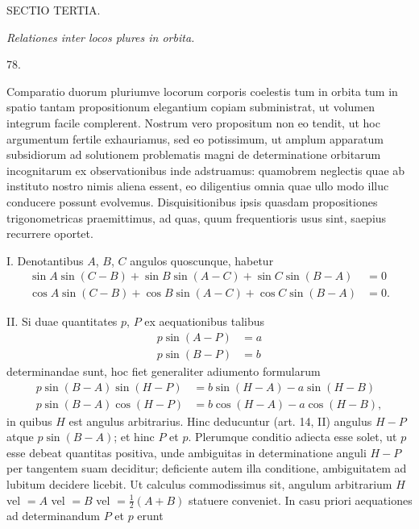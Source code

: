 \clearpage
{}
\begin{center}
{\large SECTIO TERTIA.}\par\medskip
\emph{Relationes inter locos plures in orbita.}\par\bigskip
\hypertarget{native-106-article078}{}78.
\end{center}
Comparatio duorum pluriumve locorum corporis coelestis tum in orbita tum in spatio tantam propositionum elegantium copiam subministrat, ut volumen integrum facile complerent. Nostrum vero propositum non eo tendit, ut hoc argumentum fertile exhauriamus, sed eo potissimum, ut amplum apparatum subsidiorum ad solutionem problematis magni de determinatione orbitarum incognitarum ex observationibus inde adstruamus: quamobrem neglectis quae ab instituto nostro nimis aliena essent, eo diligentius omnia quae ullo modo illuc conducere possunt evolvemus. Disquisitionibus ipsis quasdam propositiones trigonometricas praemittimus, ad quas, quum frequentioris usus sint, saepius recurrere oportet.
\par
I. Denotantibus $A$, $B$, $C$ angulos quoscunque, habetur
\[
\begin{aligned}
\sin A\sin(C-B)+\sin B\sin(A-C)+\sin C\sin(B-A)&=0\\
\cos A\sin(C-B)+\cos B\sin(A-C)+\cos C\sin(B-A)&=0.
\end{aligned}
\]
\par
II. Si duae quantitates $p$, $P$ ex aequationibus talibus
\[
\begin{aligned}
p\sin(A-P)&=a\\
p\sin(B-P)&=b
\end{aligned}
\]
determinandae sunt, hoc fiet generaliter adiumento formularum
\[
\begin{aligned}
p\sin(B-A)\sin(H-P)&=b\sin(H-A)-a\sin(H-B)\\
p\sin(B-A)\cos(H-P)&=b\cos(H-A)-a\cos(H-B),
\end{aligned}
\]
in quibus $H$ est angulus arbitrarius. Hinc deducuntur (art. 14, II) angulus $H-P$ atque $p\sin(B-A)$; et hinc $P$ et $p$. Plerumque conditio adiecta esse solet, ut $p$ esse debeat quantitas positiva, unde ambiguitas in determinatione anguli $H-P$ per tangentem suam deciditur; deficiente autem illa conditione, ambiguitatem ad lubitum decidere licebit. Ut calculus commodissimus sit, angulum arbitrarium $H$ vel $=A$ vel $=B$ vel $=\tfrac{1}{2}(A+B)$ statuere conveniet. In casu priori aequationes ad determinandum $P$ et $p$ erunt
